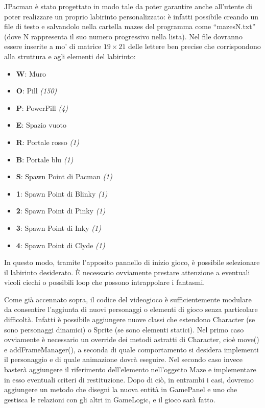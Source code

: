 \documentclass[12pt,a4paper]{report}
\begin{document}
JPacman è stato progettato in modo tale da poter garantire anche all’utente di poter realizzare un proprio labirinto personalizzato: è infatti possibile creando un file di testo e salvandolo nella cartella mazes del programma come “mazesN.txt” (dove N rappresenta il suo numero progressivo nella lista). Nel file dovranno essere inserite a mo’ di matrice $19\times21$ delle lettere ben precise che corrispondono alla struttura e agli elementi del labirinto:
\begin{itemize}
 \item \textbf{W}: Muro
 \item \textbf{O}: Pill \textit{(150)}
 \item \textbf{P}: PowerPill \textit{(4)}
 \item \textbf{E}: Spazio vuoto
 \item \textbf{R}: Portale rosso \textit{(1)}
 \item \textbf{B}: Portale blu \textit{(1)}
 \item \textbf{S}: Spawn Point di Pacman \textit{(1)}
 \item \textbf{1}: Spawn Point di Blinky \textit{(1)}
 \item \textbf{2}: Spawn Point di Pinky \textit{(1)}
 \item \textbf{3}: Spawn Point di Inky \textit{(1)}
 \item \textbf{4}: Spawn Point di Clyde \textit{(1)}
\end{itemize}
In questo modo, tramite l’apposito pannello di inizio gioco, è possibile selezionare il labirinto desiderato. È necessario ovviamente prestare attenzione a eventuali vicoli ciechi o possibili loop che possono intrappolare i fantasmi. 

Come già accennato sopra, il codice del videogioco è sufficientemente modulare da consentire l’aggiunta di nuovi personaggi o elementi di gioco senza particolare difficoltà. 
Infatti è possibile aggiungere nuove classi che estendono Character (se sono personaggi dinamici) o Sprite (se sono elementi statici). Nel primo caso ovviamente è necessario un override dei metodi astratti di Character, cioè move() e addFrameManager(), a seconda di quale comportamento si desidera implementi il personaggio e di quale animazione dovrà eseguire.
Nel secondo caso invece basterà aggiungere il riferimento dell’elemento nell’oggetto Maze e implementare in esso eventuali criteri di restituzione. Dopo di ciò, in entrambi i casi, dovremo aggiungere un metodo che disegni la nuova entità in GamePanel e uno che gestisca le relazioni con gli altri in GameLogic, e il gioco sarà fatto.
\end{document}
